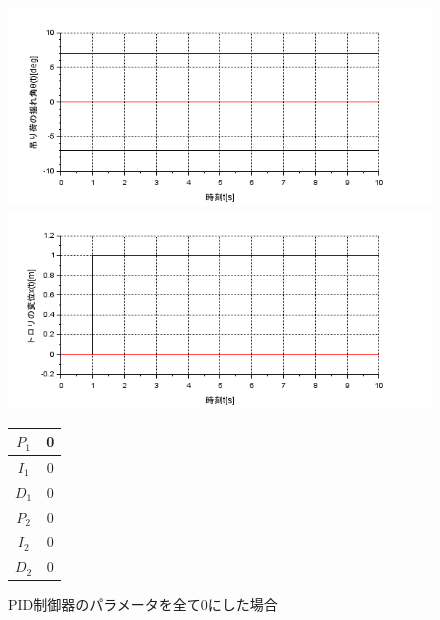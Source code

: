 \documentclass[dvipdfmx,titlepage,a4j]{jsarticle}  %
\begin{document}
\begin{figure}[H]
  \begin{minipage}{4.5cm}
    \centering
    \includegraphics[keepaspectratio, scale=0.35]{../graph/crane/ang-0.png}
  \end{minipage}
  \hfill
  \begin{minipage}{4.5cm}
    \centering
    \includegraphics[keepaspectratio, scale=0.35]{../graph/crane/po-0.png}
  \end{minipage}
  \hfill
  \begin{minipage}{3cm}
    \begin{center}
      \begin{tabular}{c|c}
        \hline
        $P_1$ & 0 \\ \hline
        $I_1$ & 0 \\ \hline
        $D_1$ & 0 \\ \hline
        $P_2$ & 0 \\ \hline
        $I_2$ & 0 \\ \hline
        $D_2$ & 0 \\
        \hline
      \end{tabular}
    \end{center}
  \end{minipage}
  \hfill
  \caption{PID制御器のパラメータを全て0にした場合}
  \label{fig:crane:0}
\end{figure}
\end{document}
